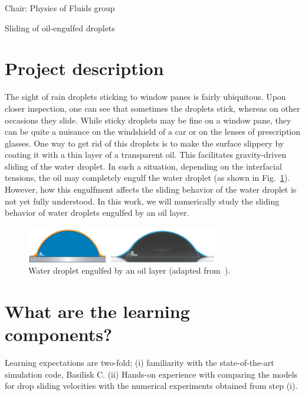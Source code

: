\documentclass[a4paper,10pt]{article}
\begin{document}
 
\thispagestyle{empty} %

\noindent Chair: Physics of Fluids group
\begin{center}
 \begin{LARGE}
 Sliding of oil-engulfed droplets
 \end{LARGE}
\end{center}

\section*{Project description}
The sight of rain droplets sticking to window panes is fairly ubiquitous. Upon closer inspection, one can see that sometimes the droplets stick, whereas on other occasions they slide. While sticky droplets may be fine on a window pane, they can be quite a nuisance on the windshield of a car or on the lenses of prescription glasses. One way to get rid of this droplets is to make the surface slippery by coating it with a thin layer of a transparent oil. This facilitates gravity-driven sliding of the water droplet. In such a situation, depending on the interfacial tensions, the oil may completely engulf the water droplet (as shown in Fig.~\ref{figure}). However, how this engulfment affects the sliding behavior of the water droplet is not yet fully understood. In this work, we will numerically study the sliding behavior of water droplets engulfed by an oil layer. 

\begin{figure}[h]
\centering
\includegraphics[width=0.75\textwidth]{engulfed_droplet.eps}
\caption{Water droplet engulfed by an oil layer (adapted from~\cite{li-2020-pnas}).}
\label{figure}
\end{figure}


\section*{What are the learning components?}
Learning expectations are two-fold; (i) familiarity with the state-of-the-art simulation code, Basilisk C. (ii) Hands-on experience with comparing the models for drop sliding velocities with the numerical experiments obtained from step (i).\\
\end{document}
